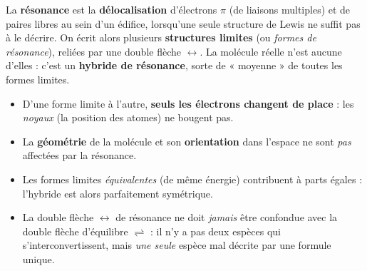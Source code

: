 \documentclass[11pt,a4paper]{article}
\begin{document}
\begin{definition}
La \textbf{résonance} est la \textbf{délocalisation} d'électrons $\pi$ (de liaisons multiples) et de
paires libres au sein d'un édifice, lorsqu'une seule structure de Lewis ne suffit pas à le décrire.
On écrit alors plusieurs \textbf{structures limites} (ou \emph{formes de résonance}), reliées par
une double flèche $\leftrightarrow$. La molécule réelle n'est aucune d'elles : c'est un
\textbf{hybride de résonance}, sorte de « moyenne » de toutes les formes limites.
\end{definition}

\begin{theoreme}
\begin{itemize}[leftmargin=1.6em,topsep=2pt,itemsep=2pt]
  \item D'une forme limite à l'autre, \textbf{seuls les électrons changent de place} : les
        \emph{noyaux} (la position des atomes) ne bougent pas.
  \item La \textbf{géométrie} de la molécule et son \textbf{orientation} dans l'espace ne sont
        \emph{pas} affectées par la résonance.
  \item Les formes limites \emph{équivalentes} (de même énergie) contribuent à parts égales :
        l'hybride est alors parfaitement symétrique.
  \item La double flèche $\leftrightarrow$ de résonance ne doit \emph{jamais} être confondue avec
        la double flèche d'équilibre $\rightleftharpoons$ : il n'y a pas deux espèces qui
        s'interconvertissent, mais \emph{une seule} espèce mal décrite par une formule unique.
\end{itemize}
\end{theoreme}
\end{document}
